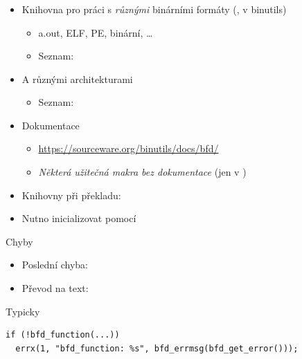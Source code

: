 \begin{frame}
  \frametitle{}

  \begin{itemize}
    \item Knihovna pro práci s \emph{různými} binárními formáty
      (, v binutils)
    \begin{itemize}
      \item a.out, ELF, PE, binární, \dots
      \item Seznam: 
    \end{itemize}

    \pause

    \item A různými architekturami
    \begin{itemize}
      \item Seznam: 
    \end{itemize}

    \pause

    \item Dokumentace
    \begin{itemize}
      \item \url{https://sourceware.org/binutils/docs/bfd/}
      \item \emph{Některá užitečná makra bez dokumentace} (jen v )
    \end{itemize}

    \pause

    \item Knihovny při překladu: 

    \pause

    \item Nutno inicializovat pomocí 
  \end{itemize}

\end{frame}

\begin{frame}[fragile]{Chyby}

  \begin{itemize}
    \item Poslední chyba: 
    \item Převod na text: 
  \end{itemize}

  \bigskip

  \begin{block}{Typicky}
  \begin{lstlisting}
if (!bfd_function(...))
  errx(1, "bfd_function: %s", bfd_errmsg(bfd_get_error()));
  \end{lstlisting} %
  \end{block}

\end{frame}

